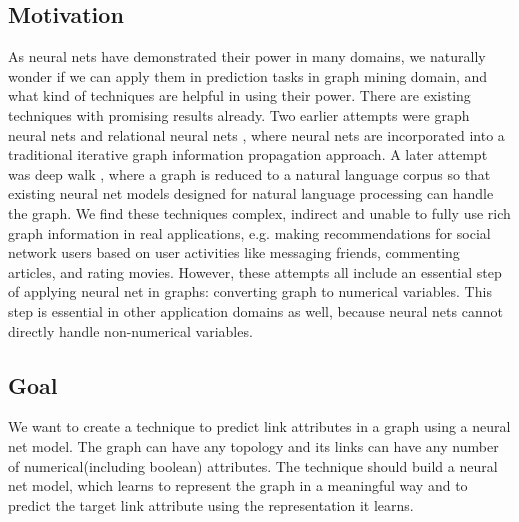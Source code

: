 \documentclass{article}
\begin{document}
\subsection{Motivation}
As neural nets have demonstrated their power in many domains, we naturally 
wonder if we can apply them in prediction tasks in graph mining domain, and 
what kind of techniques are helpful in using their power.
There are existing techniques with promising results already.
Two earlier attempts were graph neural nets and relational neural 
nets \cite{scarselli2009graph}, where neural nets are incorporated into a 
traditional iterative graph information propagation approach.
A later attempt was deep walk \cite{perozzi2014deepwalk}, where a graph is 
reduced to a natural language corpus so that existing neural net models 
designed for natural language processing can handle the graph.
We find these techniques complex, indirect and unable to fully use rich graph 
information in real applications, e.g. making recommendations for social 
network users based on user activities like messaging friends, commenting 
articles, and rating movies.
However, these attempts all include an essential step of applying neural net in 
graphs: converting graph to numerical variables.
This step is essential in other application domains as well, because neural 
nets cannot directly handle non-numerical variables.

\subsection{Goal}
We want to create a technique to predict link attributes in a graph using a 
neural net model. The graph can have any topology and its links can have any 
number of numerical(including boolean) attributes. The technique should build a 
neural net model, which learns to represent the graph in a meaningful way and 
to predict the target link attribute using the representation it learns.
\end{document}
